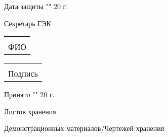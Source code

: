 \begin{footnotesize}
\vspace{1cm}

\noindent Дата защиты "\underline{\hspace{0.5cm}}" \underline{\hspace{4cm}} 20 \underline{\hspace{1cm}}г. \hspace{0.3cm}

\vspace{1cm}

\noindent Секретарь ГЭК
\begin{tabular}[t]{c} 
\underline{\hspace{5cm}} \\ {\scriptsize ФИО} \\ \end{tabular} 
\begin{tabular}[t]{c} \underline{\hspace{2.5cm}} \\ {\scriptsize 
Подпись} \\ \end{tabular} Принято
"\underline{\hspace{0.5cm}}" \underline{\hspace{2.5cm}} 20 
\underline{\hspace{1cm}}г.

\vspace{1cm}

\noindent Листов хранения \underline{\hspace{5cm}}

\vspace{1cm}

\noindent Демонстрационных материалов/Чертежей хранения 
\underline{\hspace{5cm}}
\end{footnotesize}
